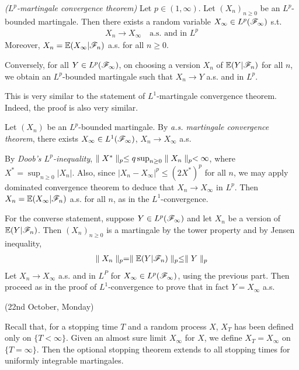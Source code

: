 \documentclass[10pt,a4paper]{report}
\newenvironment{proof}
{\begin{changemargin}{1cm}{0.5cm} 
	}%
	{\end{changemargin}
}
\begin{document}
\emph{($L^p$-martingale convergence theorem)} Let $p\in (1,\infty)$. Let $(X_n)_{n\geq 0}$ be an $L^p$-bounded martingale. Then there exists a random variable $X_{\infty} \in L^p (\mathscr{F}_{\infty})$ s.t.
\begin{align*}
X_n \rightarrow X_{\infty} \quad \text{a.s. and in } L^p
\end{align*}
Moreover, $X_n = \mathbb{E}(X_{\infty}|\mathscr{F}_n)$ a.s. for all $n\geq 0$.

\quad Conversely, for all $Y\in L^p(\mathscr{F}_{\infty})$, on choosing a version $X_n$ of $\mathbb{E}(Y|\mathscr{F}_n)$ for all $n$, we obtain an $L^p$-bounded martingale such that $X_n \rightarrow Y$ a.s. and in $L^p$.
\s

This is very similar to the statement of $L^1$-martingale convergence theorem. Indeed, the proof is also very similar.
\begin{proof}
\pf Let $(X_n)$ be an $L^p$-bounded martingale. By \emph{a.s. martingale convergence theorem}, there exists $X_{\infty} \in L^1(\mathscr{F}_{\infty})$, $X_n\rightarrow X_{\infty}$ a.s.

\quad By \emph{Doob's $L^p$-inequality}, $\parallel X^* \parallel_{p} \leq q \sup_{n\geq 0} \parallel X_n \parallel_{p} < \infty$, where $X^* = \sup_{n\geq 0} |X_n|$. Also, since $|X_n - X_{\infty}|^p \leq (2 X^*)^p$ for all $n$, we may apply dominated convergence theorem to deduce that $X_n \rightarrow X_{\infty}$ in $L^p$. Then $X_n = \mathbb{E}(X_{\infty} |\mathscr{F}_n)$ a.s. for all $n$, as in the $L^1$-convergence.
\s

\quad For the converse statement, suppose $Y\in L^p(\mathscr{F}_{\infty})$ and let $X_n$ be a version of $\mathbb{E}(Y|\mathscr{F}_n)$. Then $(X_n)_{n\geq 0}$ is a martingale by the tower property and by Jensen inequality,
\begin{align*}
\parallel X_n \parallel_{p} = \parallel \mathbb{E}(Y|\mathscr{F}_n) \parallel_{p} \leq \parallel Y \parallel_{p}
\end{align*}
Let $X_n \rightarrow X_{\infty}$ a.s. and in $L^P$ for $X_{\infty} \in L^{p}(\mathscr{F}_{\infty})$, using the previous part. Then proceed as in the proof of $L^1$-convergence to prove that in fact $Y = X_{\infty}$ a.s. 

\eop
\end{proof}
\s

\newday

(22nd October, Monday)
\s

Recall that, for a stopping time $T$ and a random process $X$, $X_T$ has been defined only on $\{T<\infty \}$. Given an almost sure limit $X_{\infty}$ for $X$, we define $X_T = X_{\infty}$ on $\{T= \infty \}$. Then the optional stopping theorem extends to all stopping times for uniformly integrable martingales.
\s
\end{document}
